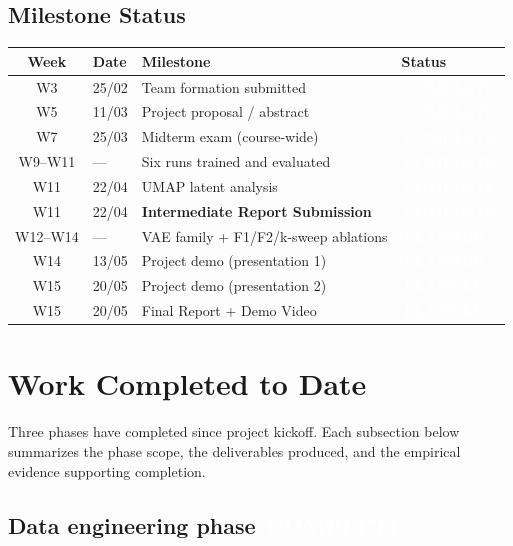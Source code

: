 \documentclass[11pt,a4paper]{article}
\newcommand{\status}[1]{%
  \ifstrequal{#1}{complete}{\colorbox{brandAccent}{\textcolor{white}{\sffamily\bfseries\small\,COMPLETE\,}}}{%
  \ifstrequal{#1}{inprogress}{\colorbox{brandAmber}{\textcolor{white}{\sffamily\bfseries\small\,IN PROGRESS\,}}}{%
  \ifstrequal{#1}{planned}{\colorbox{brandSecondary}{\textcolor{white}{\sffamily\bfseries\small\,PLANNED\,}}}{%
  \ifstrequal{#1}{deferred}{\colorbox{brandSlate}{\textcolor{white}{\sffamily\bfseries\small\,DEFERRED\,}}}{}}}}%
}
\begin{document}
\subsection{Milestone Status}

\begin{center}\small
{}
\begin{tabular}{@{}c l l l@{}}
\toprule
\textbf{Week} & \textbf{Date} & \textbf{Milestone} & \textbf{Status} \\
\midrule
W3   & 25/02     & Team formation submitted                  & \status{complete} \\
W5   & 11/03     & Project proposal / abstract               & \status{complete} \\
W7   & 25/03     & Midterm exam (course-wide)                & \status{complete} \\
W9--W11 & ---    & Six runs trained and evaluated            & \status{complete} \\
W11  & 22/04     & UMAP latent analysis                      & \status{complete} \\
W11  & 22/04     & \textbf{Intermediate Report Submission}   & \status{complete} \\
W12--W14 & ---   & VAE family + F1/F2/k-sweep ablations      & \status{planned} \\
W14  & 13/05     & Project demo (presentation 1)             & \status{planned} \\
W15  & 20/05     & Project demo (presentation 2)             & \status{planned} \\
W15  & 20/05     & Final Report + Demo Video                 & \status{planned} \\
\bottomrule
\end{tabular}
\end{center}

\clearpage

\section{Work Completed to Date}
\label{sec:work-completed}

\noindent Three phases have completed since project kickoff. Each subsection below summarizes the phase scope, the deliverables produced, and the empirical evidence supporting completion.

\subsection{Data engineering phase \hfill \status{complete}}
\label{sec:data-engineering}
\end{document}

